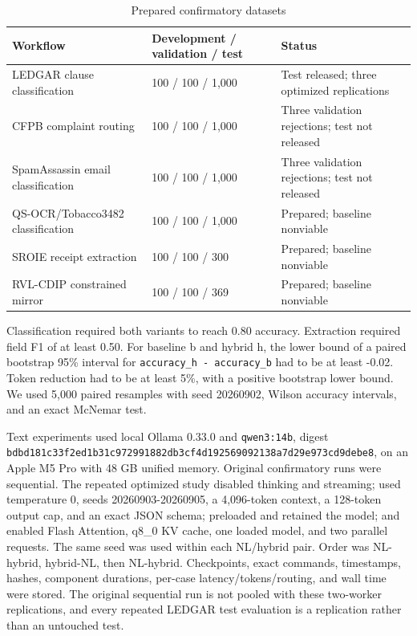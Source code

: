 \documentclass[9pt,a4paper,twocolumn]{article}
\begin{document}
\begin{table}[t]
\centering
\small
\caption{Prepared confirmatory datasets}
\begin{tabularx}{\textwidth}{@{}XXX@{}}
\toprule
Workflow & Development / validation / test & Status \\
\midrule
LEDGAR clause classification & 100 / 100 / 1,000 & Test released; three optimized replications \\
CFPB complaint routing & 100 / 100 / 1,000 & Three validation rejections; test not released \\
SpamAssassin email classification & 100 / 100 / 1,000 & Three validation rejections; test not released \\
QS-OCR/Tobacco3482 classification & 100 / 100 / 1,000 & Prepared; baseline nonviable \\
SROIE receipt extraction & 100 / 100 / 300 & Prepared; baseline nonviable \\
RVL-CDIP constrained mirror & 100 / 100 / 369 & Prepared; baseline nonviable \\
\bottomrule
\end{tabularx}
\end{table}

Classification required both variants to reach 0.80 accuracy. Extraction required field F1 of at least 0.50. For baseline b and hybrid h, the lower bound of a paired bootstrap 95\% interval for \texttt{accuracy\_h - accuracy\_b} had to be at least -0.02. Token reduction had to be at least 5\%, with a positive bootstrap lower bound. We used 5,000 paired resamples with seed 20260902, Wilson accuracy intervals, and an exact McNemar test.

Text experiments used local Ollama 0.33.0 and \texttt{qwen3:14b}, digest \texttt{bdbd181c33f2}\allowbreak\texttt{ed1b31c97299}\allowbreak\texttt{1882db3cf4d1}\allowbreak\texttt{92569092138a}\allowbreak\texttt{7d29e973cd9d}\allowbreak\texttt{ebe8}, on an Apple M5 Pro with 48 GB unified memory. Original confirmatory runs were sequential. The repeated optimized study disabled thinking and streaming; used temperature 0, seeds 20260903-20260905, a 4,096-token context, a 128-token output cap, and an exact JSON schema; preloaded and retained the model; and enabled Flash Attention, q8\_0 KV cache, one loaded model, and two parallel requests. The same seed was used within each NL/hybrid pair. Order was NL-hybrid, hybrid-NL, then NL-hybrid. Checkpoints, exact commands, timestamps, hashes, component durations, per-case latency/tokens/routing, and wall time were stored. The original sequential run is not pooled with these two-worker replications, and every repeated LEDGAR test evaluation is a replication rather than an untouched test.
\end{document}
